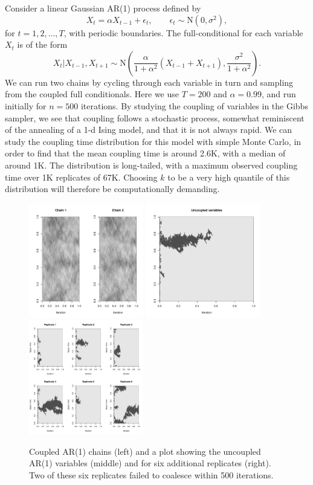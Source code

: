 \documentclass[11pt,a4paper]{article}
\begin{document}
Consider a linear Gaussian AR(1) process defined by
$$
X_t = \alpha X_{t-1} + \epsilon_t,\qquad \epsilon_t \sim {\mathrm N}(0,\sigma^2),
$$
for $t=1,2,\ldots,T$, with periodic boundaries. The full-conditional for each variable $X_t$ is of the form
$$
X_t|X_{t-1},X_{t+1} \sim {\mathrm N}\left(\frac{\alpha}{1+\alpha^2}(X_{t-1}+X_{t+1}), \frac{\sigma^2}{1+\alpha^2} \right).
$$
We can run two chains by cycling through each variable in turn and sampling from the coupled full conditionals. Here we use $T=200$ and $\alpha=0.99$, and run initially for $n=500$ iterations. By studying the coupling of variables in the Gibbs sampler, we see that coupling follows a stochastic process, somewhat reminiscent of the annealing of a 1-d Ising model, and that it is not always rapid. We can study the coupling time distribution for this model with simple Monte Carlo, in order to find that the mean coupling time is around 2.6K, with a median of around 1K. The distribution is long-tailed, with a maximum observed coupling time over 1K replicates of 67K. Choosing $k$ to be a very high quantile of this distribution will therefore be computationally demanding.

\begin{figure}
  \centerline{
    \includegraphics[height=5cm]{figs/coupled-chains}
    \qquad
    \includegraphics[height=5cm]{figs/uncoupled}
    \qquad
  \includegraphics[height=5cm]{figs/uncoupled6}
  }
\caption{Coupled AR(1) chains (left) and a plot showing the uncoupled AR(1) variables (middle) and for six additional replicates (right). Two of these six replicates failed to coalesce within 500 iterations.}
\end{figure}
\end{document}
